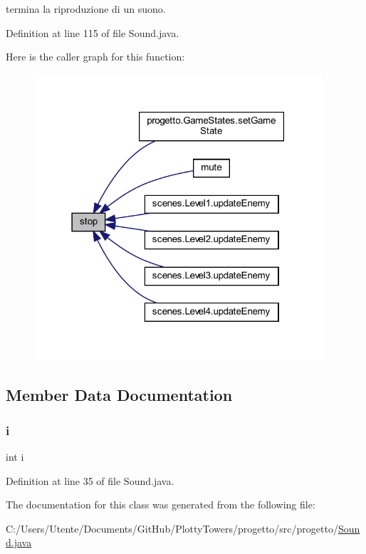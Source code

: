 termina la riproduzione di un suono. 



Definition at line 115 of file Sound.\+java.

Here is the caller graph for this function\+:\nopagebreak
\begin{figure}[H]
\begin{center}
\leavevmode
\includegraphics[width=303pt]{classprogetto_1_1_sound_a8c528baf37154d347366083f0f816846_icgraph}
\end{center}
\end{figure}


\subsection{Member Data Documentation}
\mbox{\label{classprogetto_1_1_sound_acb559820d9ca11295b4500f179ef6392}} 
\subsubsection{\texorpdfstring{i}{i}}
{\footnotesize\ttfamily int i\hspace{0.3cm}{\ttfamily [private]}}



Definition at line 35 of file Sound.\+java.



The documentation for this class was generated from the following file\+:\begin{DoxyCompactItemize}
\item 
C\+:/\+Users/\+Utente/\+Documents/\+Git\+Hub/\+Plotty\+Towers/progetto/src/progetto/\hyperlink{_sound_8java}{Sound.\+java}\end{DoxyCompactItemize}

